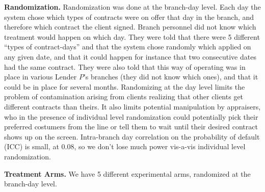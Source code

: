 \documentclass[oneside,11pt]{article}
\begin{document}
\vspace{.2in}
\noindent \textbf{Randomization.} Randomization was done at the branch-day level.  Each day the system chose which types of contracts were on offer that day in the branch, and therefore which contract the client signed. Branch personnel did not know which treatment would happen on which day. They were told that there were 5 different ``types of contract-days'' and that the system chose randomly which applied on any given date, and that it could happen for instance that two consecutive dates had the same contract. They were also told that this way of operating was in place in various Lender $P$'s branches (they did not know which ones), and that it could be in place for several months. Randomizing at the day level limits the problem of contamination arising from clients realizing that other clients get different contracts than theirs. It also limits potential manipulation by appraisers, who in the presence of individual level randomization could potentially pick their preferred costumers from the line or tell them to wait until their desired contract shows up on the screen. Intra-branch day correlation on the probability of default (ICC) is small, at 0.08, so we don't lose much power vis-a-vis individual level randomization.

\vspace{.2in}
\noindent \textbf{Treatment Arms.} We have 5 different experimental arms, randomized at the branch-day level. 
\end{document}
